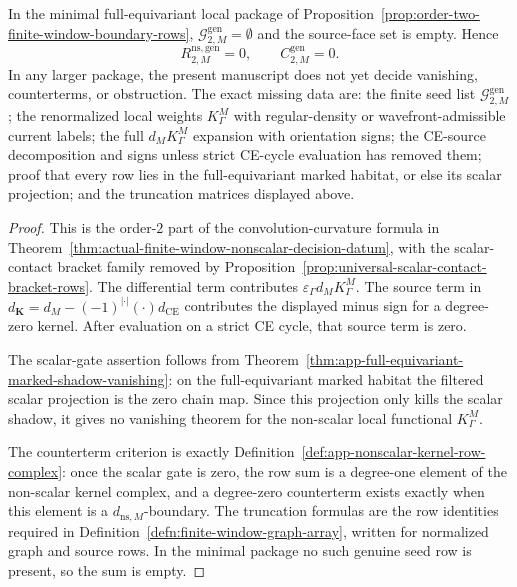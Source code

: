 \begin{prop}
  In the minimal full-equivariant local package of
  Proposition~\ref{prop:order-two-finite-window-boundary-rows},
  \(\mathcal G^{\mathrm{gen}}_{2,M}=\emptyset\) and the source-face set is
  empty.  Hence
  \[
    R^{\mathrm{ns,gen}}_{2,M}=0,
    \qquad
    C^{\mathrm{gen}}_{2,M}=0.
  \]
  In any larger package, the present manuscript does not yet decide
  vanishing, counterterms, or obstruction.  The exact missing data are:
  the finite seed list \(\mathcal G^{\mathrm{gen}}_{2,M}\); the
  renormalized local weights \(K^M_\Gamma\) with regular-density or
  wavefront-admissible current labels; the full \(d_M K^M_\Gamma\)
  expansion with orientation signs; the CE-source decomposition and signs
  unless strict CE-cycle evaluation has removed them; proof that every row
  lies in the full-equivariant marked habitat, or else its scalar
  projection; and the truncation matrices displayed above.
\end{prop}

\begin{proof}
  This is the order-\(2\) part of the convolution-curvature formula in
  Theorem~\ref{thm:actual-finite-window-nonscalar-decision-datum}, with
  the scalar-contact bracket family removed by
  Proposition~\ref{prop:universal-scalar-contact-bracket-rows}.  The
  differential term contributes \(\varepsilon_\Gamma d_M K^M_\Gamma\).  The
  source term in \(d_{\mathbf K}=d_M-(-1)^{|\cdot|}(\cdot)d_{\mathrm{CE}}\)
  contributes the displayed minus sign for a degree-zero kernel.  After
  evaluation on a strict CE cycle, that source term is zero.

  The scalar-gate assertion follows from
  Theorem~\ref{thm:app-full-equivariant-marked-shadow-vanishing}: on the
  full-equivariant marked habitat the filtered scalar projection is the
  zero chain map.  Since this projection only kills the scalar shadow, it
  gives no vanishing theorem for the non-scalar local functional
  \(K^M_\Gamma\).

  The counterterm criterion is exactly
  Definition~\ref{def:app-nonscalar-kernel-row-complex}: once the scalar
  gate is zero, the row sum is a degree-one element of the non-scalar
  kernel complex, and a degree-zero counterterm exists exactly when this
  element is a \(d_{\mathrm{ns},M}\)-boundary.  The truncation formulas are
  the row identities required in
  Definition~\ref{defn:finite-window-graph-array}, written for normalized
  graph and source rows.  In the minimal package no such genuine seed row
  is present, so the sum is empty.
\end{proof}

